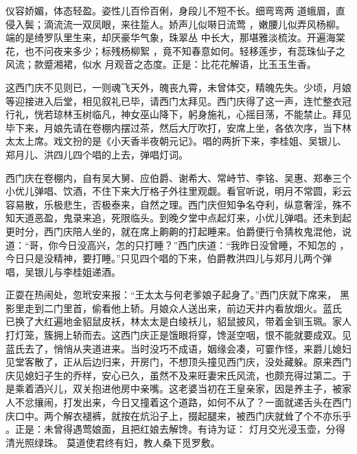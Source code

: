 仪容娇媚，体态轻盈。姿性儿百伶百俐，身段儿不短不长。细弯弯两
道蛾眉，直侵入鬓；滴流流一双凤眼，来往踅人。娇声儿似啭日流莺
，嫩腰儿似弄风杨柳。端的是绮罗队里生来，却厌豪华气象，珠翠丛
中长大，那堪雅淡梳汝。开遍海棠花，也不问夜来多少；标残杨柳絮
，竟不知春意如何。轻移莲步，有蕊珠仙子之风流；款蹙湘裙，似水
月观音之态度。正是：比花花解语，比玉玉生香。

这西门庆不见则已，一则魂飞天外，魄丧九霄，未曾体交，精魄先失。少顷，月娘
等迎接进入后堂，相见叙礼已毕，请西门太拜见。西门庆得了这一声，连忙整衣冠
行礼，恍若琼林玉树临凡，神女巫山降下，躬身施礼，心摇目荡，不能禁止。拜见
毕下来，月娘先请在卷棚内摆过茶，然后大厅吹打，安席上坐，各依次序，当下林
太太上席。戏文扮的是《小天香半夜朝元记》。唱的两折下来，李桂姐、吴银儿、
郑月儿、洪四儿四个唱的上去，弹唱灯词。

西门庆在卷棚内，自有吴大舅、应伯爵、谢希大、常峙节、李铭、吴惠、郑奉三个
小优儿弹唱、饮酒，不住下来大厅格子外往里观觑。看官听说，明月不常圆，彩云
容易散，乐极悲生，否极泰来，自然之理。西门庆但知争名夺利，纵意奢淫，殊不
知天道恶盈，鬼录来追，死限临头。到晚夕堂中点起灯来，小优儿弹唱。还未到起
更时分，西门庆陪人坐的，就在席上齁齁的打起睡来。伯爵便行令猜枚鬼混他，说
道：“哥，你今日没高兴，怎的只打睡？”西门庆道：“我昨日没曾睡，不知怎的
，今日只是没精神，要打睡。”只见四个唱的下来，伯爵教洪四儿与郑月儿两个弹
唱，吴银儿与李桂姐递酒。

正耍在热闹处，忽玳安来报：“王太太与何老爹娘子起身了。”西门庆就下席来，
黑影里走到二门里首，偷看他上轿。月娘众人送出来，前边天井内看放烟火。蓝氏
已换了大红遍地金貂鼠皮袄，林太太是白绫袄儿，貂鼠披风，带着金钏玉珮。家人
打灯笼，簇拥上轿而去。这西门庆正是饿眼将穿，馋涎空咽，恨不能就要成双。见
蓝氏去了，悄悄从夹道进来。当时没巧不成语，姻缘会凑，可霎作怪，来爵儿媳妇
见堂客散了，正从后边归来，开房门，不想顶头撞见西门庆，没处藏躲。原来西门
庆见媳妇子生的乔样，安心已久，虽然不及来旺妻宋氏风流，也颇充得过第二。于
是乘着酒兴儿，双关抱进他房中亲嘴。这老婆当初在王皇亲家，因是养主子，被家
人不忿攘闹，打发出来，今日又撞着这个道路，如何不从了？一面就递舌头在西门
庆口中。两个解衣褪裤，就按在炕沿子上，掇起腿来，被西门庆就耸了个不亦乐乎
。正是：未曾得遇莺娘面，且把红娘去解馋。有诗为证：
灯月交光浸玉壶，分得清光照绿珠。
莫道使君终有妇，教人桑下觅罗敷。